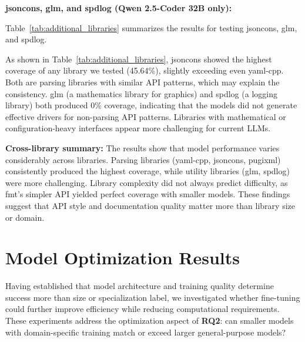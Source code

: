 \textbf{jsoncons, glm, and spdlog (Qwen 2.5-Coder 32B only):}

Table~\ref{tab:additional_libraries} summarizes the results for testing jsoncons, glm, and spdlog.

\begin{table}[htbp]
\centering
\caption{Qwen 2.5-Coder 32B Performance Across Additional Libraries}
\label{tab:additional_libraries}
\end{table}

As shown in Table~\ref{tab:additional_libraries}, jsoncons showed the highest coverage of any library we tested (45.64\%), slightly exceeding even yaml-cpp. Both are parsing libraries with similar API patterns, which may explain the consistency. glm (a mathematics library for graphics) and spdlog (a logging library) both produced 0\% coverage, indicating that the models did not generate effective drivers for non-parsing API patterns. Libraries with mathematical or configuration-heavy interfaces appear more challenging for current LLMs.

\textbf{Cross-library summary:} The results show that model performance varies considerably across libraries. Parsing libraries (yaml-cpp, jsoncons, pugixml) consistently produced the highest coverage, while utility libraries (glm, spdlog) were more challenging. Library complexity did not always predict difficulty, as fmt's simpler API yielded perfect coverage with smaller models. These findings suggest that API style and documentation quality matter more than library size or domain.


\section{Model Optimization Results}
\label{sec:results_optimization}

Having established that model architecture and training quality determine success more than size or specialization label, we investigated whether fine-tuning could further improve efficiency while reducing computational requirements. These experiments address the optimization aspect of \textbf{RQ2}: can smaller models with domain-specific training match or exceed larger general-purpose models?

